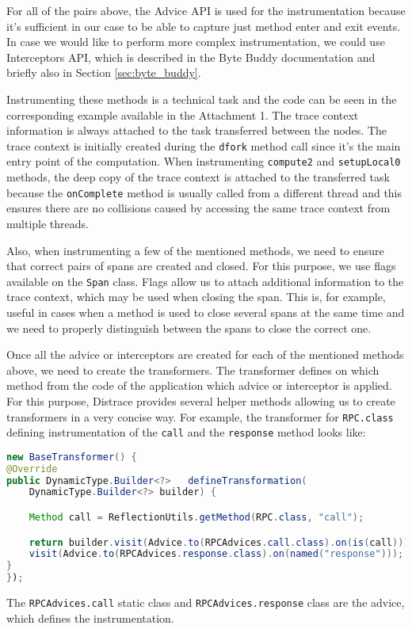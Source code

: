 For all of the pairs above, the Advice API is used for the instrumentation because it's sufficient in our case to be able to capture just method enter and exit events. In case we would like to perform more complex instrumentation, we could use Interceptors API, which is described in the Byte Buddy documentation and briefly also in Section \ref{sec:byte_buddy}.

Instrumenting these methods is a technical task and the code can be seen in the corresponding example available in the Attachment 1. The trace context information is always attached to the task transferred between the nodes. The trace context is initially created during the \texttt{dfork} method call since it's the main entry point of the computation. When instrumenting \texttt{compute2} and \texttt{setupLocal0} methods, the deep copy of the trace context is attached to the transferred task because the \texttt{onComplete} method is usually called from a different thread and this ensures there are no collisions caused by accessing the same trace context from multiple threads.

Also, when instrumenting a few of the mentioned methods, we need to ensure that correct pairs of spans are created and closed. For this purpose, we use flags available on the \texttt{Span} class. Flags allow us to attach additional information to the trace context, which may be used when closing the span. This is, for example, useful in cases when a method is used to close several spans at the same time and we need to properly distinguish between the spans to close the correct one.

Once all the advice or interceptors are created for each of the mentioned methods above, we need to create the transformers. The transformer defines on which method from the code of the application which advice or interceptor is applied. For this purpose, Distrace provides several helper methods allowing us to create transformers in a very concise way. For example, the transformer for \texttt{RPC.class} defining instrumentation of the \texttt{call} and the \texttt{response} method looks like:

\begin{lstlisting}[language=Java]
new BaseTransformer() {
@Override
public DynamicType.Builder<?> 	defineTransformation(
	DynamicType.Builder<?> builder) {

	Method call = ReflectionUtils.getMethod(RPC.class, "call");

	return builder.visit(Advice.to(RPCAdvices.call.class).on(is(call))).
	visit(Advice.to(RPCAdvices.response.class).on(named("response")));
}
});
\end{lstlisting}
The \texttt{RPCAdvices.call} static class and \texttt{RPCAdvices.response} class are the advice, which defines the instrumentation.

